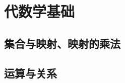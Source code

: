 
\section{代数学基础}
\label{sec:algebra-base}

\subsection{集合与映射、映射的乘法}
\label{sec:set-and-map}

\subsection{运算与关系}
\label{sec:relation}




